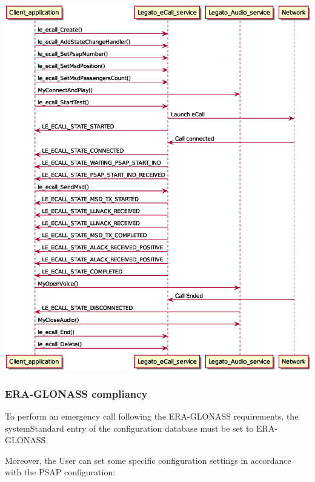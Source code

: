 \begin{DoxyImageNoCaption}
  \mbox{\includegraphics[width=\textwidth,height=\textheight/2,keepaspectratio=true]{le_eCall_state_machine}}
\end{DoxyImageNoCaption}
\hypertarget{c_SDD_eCall_le_ecall_eraglonass}{}\subsubsection{E\+R\+A-\/\+G\+L\+O\+N\+A\+S\+S compliancy}\label{c_SDD_eCall_le_ecall_eraglonass}
To perform an emergency call following the E\+R\+A-\/\+G\+L\+O\+N\+A\+SS requirements, the \textquotesingle{}system\+Standard\textquotesingle{} entry of the configuration database must be set to \textquotesingle{}E\+R\+A-\/\+G\+L\+O\+N\+A\+SS\textquotesingle{}.

Moreover, the User can set some specific configuration settings in accordance with the P\+S\+AP configuration\+:



